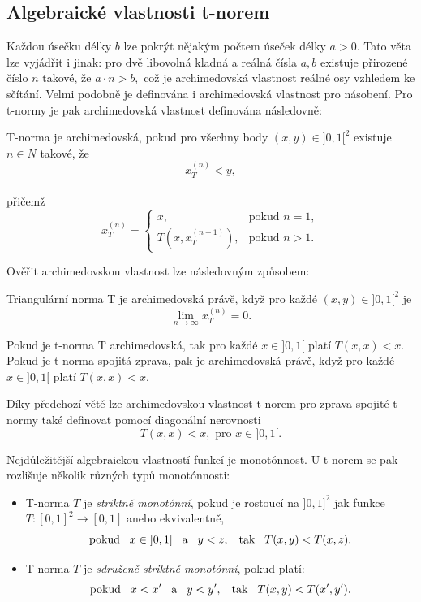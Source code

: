 \subsection{Algebraick\'e vlastnosti t-norem}

Každou \' usečku délky $b$ lze pokrýt nějakým počtem \' useček délky $a > 0.$ Tato věta lze vyjádřit i jinak: pro dvě libovolná kladná a reálná čísla $a,b$ existuje přirozené číslo $n$ takové, že $a\cdot n>b,$ což je archimedovská vlastnost reálné osy vzhledem ke sčítání. Velmi podobně je definována i archimedovská vlastnost pro násobení. Pro t-normy je pak archimedovská vlastnost definována následovně:
\begin{definition}
\cite{KMP}
    T-norma je archimedovská, pokud pro všechny body $(x,y) \in ]0,1[^2$ existuje $n \in N$ takové, že $$x_T^{(n)} < y,$$\\
    p\v ri\v cem\v z $$x^{(n)}_T=\begin{cases} x, &\mbox {pokud $n=1,$} \\ {T(x,x_T^{(n-1)})},
&\mbox {pokud $n>1.$}\end{cases}$$

\end{definition}
Ověřit archimedovskou vlastnost lze následovným zp\r usobem:
\begin{sentence} \cite{KMP}
    Triangulární norma T je archimedovská právě, když pro každé $(x,y) \in ]0,1[^2$ je $$\lim_{n \to \infty}x_T^{(n)} = 0.$$
\end{sentence}
\begin{sentence} \cite{KMP}
    Pokud je t-norma T archimedovská, tak pro každé $x \in ]0,1[$ platí $T(x,x) < x.$\\
    Pokud je t-norma spojitá zprava, pak je archimedovská právě, když pro každé $x \in ]0,1[$ platí $T(x,x) < x.$
\end{sentence}

    Díky p\v redchozí v\v et\v e lze  archimedovskou vlastnost t-norem pro zprava spojit\'e t-normy také definovat pomocí diagonální nerovnosti $$T(x,x) < x, \mbox{ pro } x \in ]0,1[.$$

    Nejd\r uležitější algebraickou vlastností funkcí je monot\' onnost. U t-norem se pak rozlišuje několik r\r uzných typ\r u monot\' onnosti:
    \begin{definition}
    \cite{KMP}
        \begin{itemize}
            \item T-norma $T$ je {\em striktně
            monot\' onní}, pokud
            je rostoucí na $]0,1]^2$ jak funkce $ T:[0,1]^2 \rightarrow [0,1]$ anebo
            ekvivalentně,
            $$ \text {pokud} \hskip 3mm x \in \hskip 1mm ]0,1] \hskip 3mm \text{a} \hskip 3mm y < z, \hskip 3mm \text {tak} \hskip 3mm T(x,y) < T(x,z). $$
            \item  T-norma $T$ je {\em sdruženě striktně
            monot\' onní}, pokud platí:
            $$ \text{pokud} \hskip 3mm  x < x'\hskip 3mm \text{a} \hskip 3mm y<y',
            \hskip 3mm  \text{tak} \hskip 3mm   T(x,y)<T(x',y').$$
            \end{itemize}
    \end{definition}

